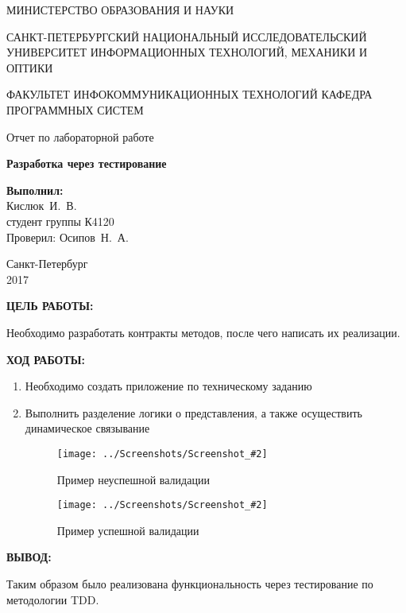 \documentclass[14pt,a4paper]{extreport}
\newcommand{\screenshot}[2]{\begin{figure}[ht]%
\centering\texttt{[image: ../Screenshots/Screenshot\_\#2]}%
\caption{#1}%
\label{picture#2}%
\end{figure}%
}
\newcommand{\header}[1]{%
{
\fontsize{16pt}{14pt}\selectfont
\begin{center}
\textbf{\MakeUppercase{#1}:}
\end{center}
}
}
\newcommand{\osipov}{Осипов~Н.~А.}
\newcommand{\igork}{Кислюк~И.~В.}
\begin{document}
	\begin{titlepage}
	\begin{center}	
		\fontsize{14pt}{14pt}\selectfont
		МИНИСТЕРСТВО ОБРАЗОВАНИЯ И НАУКИ\\

		\vspace*{0.6\baselineskip}
		
		САНКТ-ПЕТЕРБУРГСКИЙ НАЦИОНАЛЬНЫЙ ИССЛЕДОВАТЕЛЬСКИЙ УНИВЕРСИТЕТ ИНФОРМАЦИОННЫХ ТЕХНОЛОГИЙ, МЕХАНИКИ И ОПТИКИ
		
		\vspace*{0.6\baselineskip}
		ФАКУЛЬТЕТ ИНФОКОММУНИКАЦИОННЫХ ТЕХНОЛОГИЙ
		КАФЕДРА ПРОГРАММНЫХ СИСТЕМ
	
		\vspace*{7\baselineskip}
		\fontsize{19pt}{18pt}\selectfont
		Отчет по лабораторной работе
		
		\fontsize{20pt}{18pt}\selectfont
		\textbf{Разработка через тестирование}\\
		\vspace*{1.15\baselineskip}
		\end{center}
	
	\vspace*{2\baselineskip}
	\begin{flushright}
	\fontsize{14pt}{14pt}\selectfont
	\textbf{Выполнил:}\\
	\igork\\
	студент группы К4120\\
	Проверил: \osipov\\
	\end{flushright}
	
	\vspace{\fill}
	\begin{center}
	Санкт-Петербург\\
	2017
	\end{center}
	
\end{titlepage}

\newpage

\header{Цель работы}

\fontsize{14pt}{14pt}\selectfont

Необходимо разработать контракты методов, после чего написать их реализации.

\clearpage

\header{Ход работы}

\begin{enumerate}

\item Необходимо создать приложение по техническому заданию
\item Выполнить разделение логики о представления, а также осуществить динамическое связывание


\screenshot{Пример неуспешной валидации}{1}
\screenshot{Пример успешной валидации}{2}

\end{enumerate}

\clearpage

\header{Вывод}

Таким образом было реализована функциональность через тестирование по методологии TDD.
\end{document}
